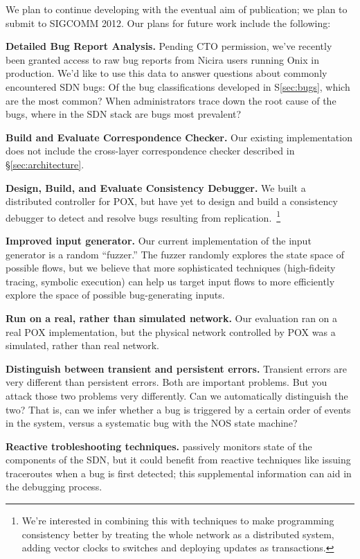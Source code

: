     We plan to continue developing \projectname{} with the eventual aim of publication; we plan to 
submit to SIGCOMM 2012. 
    Our plans for future work include the following:

    {\bf Detailed Bug Report Analysis.} Pending CTO permission, we've recently
     been granted access to raw bug reports from Nicira users running Onix in production. 
     We'd like to use this data to answer questions about commonly encountered SDN bugs: 
     Of the bug classifications developed in S\ref{sec:bugs}, which are the most common?    
     When administrators trace down the root cause of the bugs, where in the SDN stack are
     bugs most prevalent?

    {\bf Build and Evaluate Correspondence Checker.} Our existing implementation does not
    include the cross-layer correspondence checker described in \S\ref{sec:architecture}.

    {\bf Design, Build, and Evaluate Consistency Debugger.} We built a distributed controller for
    POX, but have yet to design and build a consistency debugger to detect and resolve bugs
    resulting from replication.~\footnote{We're interested in combining this with techniques to make
    programming consistency better by treating the whole network as a distributed system, \eg{} adding
    vector clocks to switches and deploying updates as transactions.}

    {\bf Improved input generator.} Our current implementation of the input generator is
    a random ``fuzzer.'' The fuzzer randomly explores the state space of possible flows, but
    we believe that more sophisticated techniques (high-fideity tracing, symbolic execution) can help
    us target input flows to more efficiently explore the space of possible bug-generating inputs. 

    {\bf Run on a real, rather than simulated network.} Our evaluation ran on a real POX implementation,
    but the physical network controlled by POX was a simulated, rather than real network.

    {\bf Distinguish between transient and persistent errors.}  Transient errors are very different than persistent errors. Both are
    important problems. But you attack those two problems very differently. Can we
    automatically distinguish the two? That is, can we infer whether a bug is
    triggered by a certain order of events in the system, versus a systematic bug
    with the NOS state machine?

    {\bf Reactive trobleshooting techniques.} \projectname{} passively monitors state of the 
    components of the SDN, but it could benefit from reactive techniques like issuing traceroutes
    when a bug is first detected; this supplemental information can aid in the debugging process.

